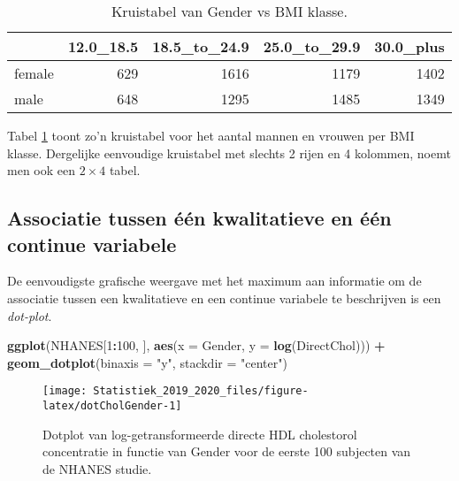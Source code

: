 \documentclass[12pt,dutch,coursenotes]{book}
\newenvironment{Shaded}{\begin{snugshade}}{\end{snugshade}}
\newcommand{\KeywordTok}[1]{\textcolor[rgb]{0.13,0.29,0.53}{\textbf{#1}}}
\newcommand{\DataTypeTok}[1]{\textcolor[rgb]{0.13,0.29,0.53}{#1}}
\newcommand{\DecValTok}[1]{\textcolor[rgb]{0.00,0.00,0.81}{#1}}
\newcommand{\StringTok}[1]{\textcolor[rgb]{0.31,0.60,0.02}{#1}}
\newcommand{\OperatorTok}[1]{\textcolor[rgb]{0.81,0.36,0.00}{\textbf{#1}}}
\newcommand{\NormalTok}[1]{#1}
\theoremstyle{definition}
\theoremstyle{definition}
\theoremstyle{definition}
\theoremstyle{remark}
\begin{document}
\begin{table}[t]

\caption{\label{tab:genderBMI}Kruistabel van Gender vs BMI klasse.}
\centering
\begin{tabular}{lrrrr}
\toprule
  & 12.0\_18.5 & 18.5\_to\_24.9 & 25.0\_to\_29.9 & 30.0\_plus\\
\midrule
female & 629 & 1616 & 1179 & 1402\\
male & 648 & 1295 & 1485 & 1349\\
\bottomrule
\end{tabular}
\end{table}

Tabel \ref{tab:genderBMI} toont zo'n kruistabel voor het aantal mannen
en vrouwen per BMI klasse. Dergelijke eenvoudige kruistabel met slechts
2 rijen en 4 kolommen, noemt men ook een \(2\times 4\) tabel.

\subsection{Associatie tussen één kwalitatieve en één continue
variabele}\label{subsec:asskwalcont}

De eenvoudigste grafische weergave met het maximum aan informatie om de
associatie tussen een kwalitatieve en een continue variabele te
beschrijven is een \emph{dot-plot}.

\begin{Shaded}
\begin{Highlighting}[]
\KeywordTok{ggplot}\NormalTok{(NHANES[}\DecValTok{1}\OperatorTok{:}\DecValTok{100}\NormalTok{, ], }\KeywordTok{aes}\NormalTok{(}\DataTypeTok{x =}\NormalTok{ Gender, }\DataTypeTok{y =} \KeywordTok{log}\NormalTok{(DirectChol))) }\OperatorTok{+}\StringTok{ }
\StringTok{    }\KeywordTok{geom_dotplot}\NormalTok{(}\DataTypeTok{binaxis =} \StringTok{"y"}\NormalTok{, }\DataTypeTok{stackdir =} \StringTok{"center"}\NormalTok{)}
\end{Highlighting}
\end{Shaded}

\begin{figure}

{\centering \texttt{[image: Statistiek\_2019\_2020\_files/figure-latex/dotCholGender-1]} 

}

\caption{Dotplot van log-getransformeerde directe HDL cholestorol concentratie in functie van Gender voor de eerste 100 subjecten van de NHANES studie.}\label{fig:dotCholGender}
\end{figure}
\end{document}
